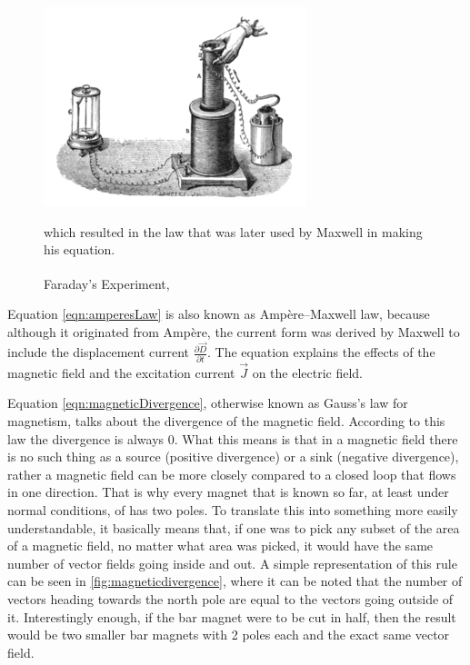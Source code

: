 \begin{figure}
	\centering
	\includegraphics{Figures/faradayexp}
	\decoRule
	\caption[Faraday's Experiment]{Faraday's Experiment,\textsuperscript{\cite{poyser1918magnetism}}} which resulted in the law that was later used by Maxwell in making his equation.
	\label{fig:faradayexp}
\end{figure}

Equation \ref{eqn:amperesLaw} is also known as Ampère–Maxwell law, because although it originated from Ampère, the current form was derived by Maxwell to include the displacement current $\frac{\partial \vec{D}}{\partial t}$. The equation explains the effects of the magnetic field and the excitation current $\vec{J}$ on the electric field.

Equation \ref{eqn:magneticDivergence}, otherwise known as Gauss's law for magnetism, talks about the divergence of the magnetic field. According to this law the divergence is always 0. What this means is that in a magnetic field there is no such thing as a source (positive divergence) or a sink (negative divergence), rather a magnetic field can be more closely compared to a closed loop that flows in one direction. That is why every magnet that is known so far, at least under normal conditions, of has two poles. To translate this into something more easily understandable, it basically means that, if one was to pick any subset of the area of a magnetic field, no matter what area was picked, it would have the same number of vector fields going inside and out. A simple representation of this rule can be seen in \ref{fig:magneticdivergence}, where it can be noted that the number of vectors heading towards the north pole are equal to the vectors going outside of it. Interestingly enough, if the bar magnet were to be cut in half, then the result would be two smaller bar magnets with 2 poles each and the exact same vector field.


